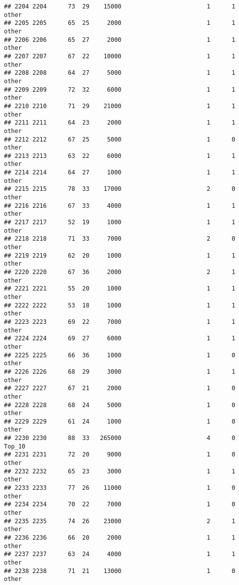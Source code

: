 \documentclass[
]{article}
\begin{document}
\begin{verbatim}
## 2204 2204      73  29    15000                        1      1    other
## 2205 2205      65  25     2000                        1      1    other
## 2206 2206      65  27     2000                        1      1    other
## 2207 2207      67  22    10000                        1      1    other
## 2208 2208      64  27     5000                        1      1    other
## 2209 2209      72  32     6000                        1      1    other
## 2210 2210      71  29    21000                        1      1    other
## 2211 2211      64  23     2000                        1      1    other
## 2212 2212      67  25     5000                        1      0    other
## 2213 2213      63  22     6000                        1      1    other
## 2214 2214      64  27     1000                        1      1    other
## 2215 2215      78  33    17000                        2      0    other
## 2216 2216      67  33     4000                        1      1    other
## 2217 2217      52  19     1000                        1      1    other
## 2218 2218      71  33     7000                        2      0    other
## 2219 2219      62  20     1000                        1      1    other
## 2220 2220      67  36     2000                        2      1    other
## 2221 2221      55  20     1000                        1      1    other
## 2222 2222      53  18     1000                        1      1    other
## 2223 2223      69  22     7000                        1      1    other
## 2224 2224      69  27     6000                        1      1    other
## 2225 2225      66  36     1000                        1      0    other
## 2226 2226      68  29     3000                        1      1    other
## 2227 2227      67  21     2000                        1      0    other
## 2228 2228      68  24     5000                        1      0    other
## 2229 2229      61  24     1000                        1      0    other
## 2230 2230      88  33   265000                        4      0   Top_10
## 2231 2231      72  20     9000                        1      0    other
## 2232 2232      65  23     3000                        1      1    other
## 2233 2233      77  26    11000                        1      0    other
## 2234 2234      70  22     7000                        1      0    other
## 2235 2235      74  26    23000                        2      1    other
## 2236 2236      66  20     2000                        1      1    other
## 2237 2237      63  24     4000                        1      1    other
## 2238 2238      71  21    13000                        1      0    other

\end{verbatim}
\end{document}
